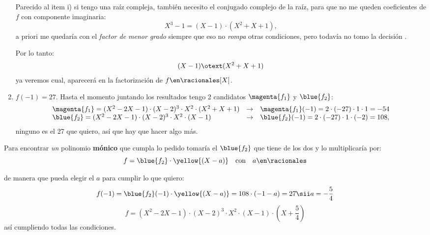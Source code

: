 \begin{enumerate}[label=\roman*)]
        Parecido al item i) si tengo una raíz compleja, también necesito el conjugado complejo de la raíz, para que no me queden
        coeficientes de $f$ con componente imaginaria:
        $$
          X^3 - 1 = (X-1) \cdot (X^2 + X +1),
        $$
        a priori me quedaría con el \textit{factor de menor grado} siempre que eso no \textit{rompa} otras condiciones, pero todavía no tomo
        la decisión .

        Por lo tanto:
        $$
          (X-1) \otext (X^2 + X +1)
        $$
        ya veremos cual, aparecerá en la factorización de $f \en \racionales[X]$.

\item $f(-1) = 27$. Hasta el momento juntando los resultados tengo 2 candidatos $\magenta{f_1}$ y $\blue{f_2}$:
        $$
          \begin{array}{lcl}
            \magenta{f_1} = (X^2 - 2X - 1)\cdot (X-2)^3 \cdot X^2 \cdot (X^2 + X + 1) & \to & \magenta{f_1}(-1) = 2 \cdot (-27) \cdot 1 \cdot 1 = -54  \\
            \blue{f_2} = (X^2 - 2X - 1)\cdot (X-2)^3 \cdot X^2 \cdot (X-1)            & \to & \blue{f_2}(-1) =  2 \cdot (-27) \cdot 1 \cdot (-2) = 108,
          \end{array}
        $$
        ninguno es el 27 que quiero, así que hay que hacer algo más.
\end{enumerate}

Para encontrar \textit{un} polinomio \textbf{mónico} que cumpla lo pedido tomaría el $\blue{f_2}$ que tiene  de los dos y lo multiplicaría por:
$$
  f = \blue{f_2} \cdot \yellow{(X - a)} \quad \text{con} \quad a \en \racionales
$$

de manera que pueda elegir el $a$ para cumplir lo que quiero:
$$
  f(-1) = \blue{f_2}(-1) \cdot \yellow{(X - a)}  = 108 \cdot (-1 - a) = 27 \sii a = -\frac{5}{4}
$$
$$
  f =  (X^2 - 2X - 1)\cdot (X-2)^3 \cdot X^2 \cdot (X-1) \cdot (X + \frac{5}{4})
$$
así cumpliendo todas las condiciones.

\begin{aportes}
  \item {}
  \item {}
\end{aportes}
